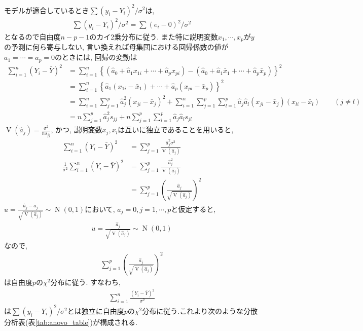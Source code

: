 モデルが適合しているとき$\sum(y_i-Y_i)^2/\sigma^2$は, 
\begin{align*}
  \sum(y_i-Y_i)^2/\sigma^2 = \sum(e_i-0)^2/\sigma^2
\end{align*}
となるので自由度$n-p-1$のカイ2乗分布に従う. また特に説明変数$x_1, \cdots, x_p$が$y$の予測に何ら寄与しない, 言い換えれば母集団における回帰係数の値が$a_1=\cdots = a_p=0$のときには, 
回帰の変動は
\begin{align*}
  \sum_{i=1}^{n}(Y_i-\bar{Y})^2
  &= \sum_{i=1}^{n}\left\{
    (\hat{a}_0 + \hat{a}_{1}x_{1i} + \cdots + \hat{a}_{p}x_{pi})
    - (\hat{a}_0 + \hat{a}_{1}\bar{x}_1 + \cdots + \hat{a}_{p}\bar{x}_p)
  \right\}^2 \\
  &= \sum_{i=1}^{n} \left\{
    \hat{a}_1(x_{1i}-\bar{x}_1) + \cdots + \hat{a}_p(x_{pi}-\bar{x}_p)
  \right\}^2 \\
  &= \sum_{i=1}^{n} \sum_{j=1}^p \hat{a}_j^2(x_{ji} - \bar{x}_{j})^2
  + \sum_{i=1}^n\sum_{j=1}^p\sum_{l=1}^p \hat{a}_j\hat{a}_l(x_{ji}-\bar{x}_{j})(x_{li}-\bar{x}_l) \qquad (j\neq l)\\
  &= n\sum_{j=1}^p \hat{a}_j^2s_{jj} 
  + n\sum_{j=1}^p\sum_{l=1}^p\hat{a}_j\hat{a}_ls_{jl} 
\end{align*}
$\operatorname{V}(\hat{a}_j)=\frac{\sigma^2}{ns_{jj}}$, かつ, 説明変数$x_j, x_l$は互いに独立であることを用いると, 
\begin{align*}
  \sum_{i=1}^{n}(Y_i-\bar{Y})^2
  &= \sum_{j=1}^p\frac{\hat{a}_j^2\sigma^2}{\operatorname{V}(\hat{a}_j)} \\
  \frac{1}{\sigma^2}\sum_{i=1}^{n}(Y_i-\bar{Y})^2 
  &= \sum_{j=1}^p\frac{\hat{a}_j^2}{\operatorname{V}(\hat{a}_j)} \\
  &= \sum_{j=1}^p\left( \frac{\hat{a}_j}{\sqrt{\operatorname{V}(\hat{a}_j)}} \right)^2
\end{align*}
$u = \frac{\hat{a}_j -a_j}{\sqrt{\operatorname{V}(\hat{a}_j)}}\sim \operatorname{N}(0, 1)$において, $a_j=0, j=1, \cdots, p$と仮定すると, 
\begin{align*}
  u= \frac{\hat{a}_j}{\sqrt{\operatorname{V}(\hat{a}_j)}} \sim \operatorname{N}(0, 1)
\end{align*}
なので, 
\begin{align*}
  \sum_{j=1}^p\left( \frac{\hat{a}_j}{\sqrt{\operatorname{V}(\hat{a}_j)}} \right)^2
\end{align*}
は自由度$p$の$\chi^2$分布に従う. すなわち,
\begin{align*}
  \sum_{i=1}^n\frac{(Y_i - \bar{Y})^2}{\sigma^2}
\end{align*}
は$\sum(y_i-Y_i)^2/\sigma^2$とは独立に自由度$p$の$\chi^2$分布に従う.これより次のような分散分析表(表\ref{tab:anovo_table})が構成される. 

